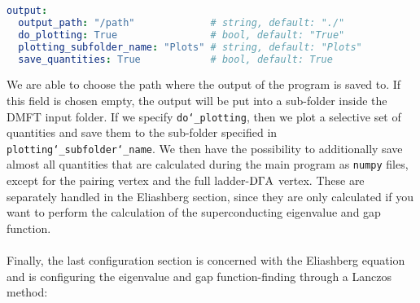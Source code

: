 \documentclass[../../main.tex]{subfiles}
\begin{document}
\begin{minipage}{\textwidth}%
\begin{lstlisting}[language=yaml]
output:
  output_path: "/path"             # string, default: "./"
  do_plotting: True                # bool, default: "True"
  plotting_subfolder_name: "Plots" # string, default: "Plots"
  save_quantities: True            # bool, default: True
\end{lstlisting}
\end{minipage}
We are able to choose the path where the output of the program is saved to. If this field is chosen empty, the output will be put into a sub-folder inside the DMFT input folder. If we specify \texttt{do\char`_plotting}, then we plot a selective set of quantities and save them to the sub-folder specified in \texttt{plotting\char`_subfolder\char`_name}. We then have the possibility to additionally save almost all quantities that are calculated during the main program as \texttt{numpy} files, except for the pairing vertex and the full ladder-$\text{D}\Gamma\text{A}$ vertex. These are separately handled in the Eliashberg section, since they are only calculated if you want to perform the calculation of the superconducting eigenvalue and gap function.
\\\\
Finally, the last configuration section is concerned with the Eliashberg equation and is configuring the eigenvalue and gap function-finding through a Lanczos method:
\end{document}
